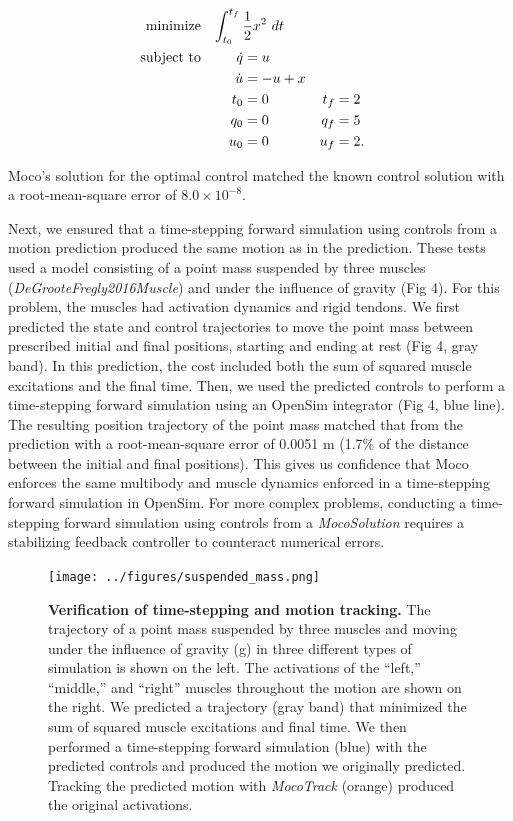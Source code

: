 \documentclass[10pt,letterpaper]{article}
\newcommand{\analytic}{
\begin{equation}
    \begin{aligned}
        \mbox{minimize} \quad
         \mathrlap{\int_{t_0}^{t_f} \frac{1}{2}x^2~dt}  \\
         \mbox{subject to} \quad
         && \dot{q} &= u \\
         && \dot{u} &= -u + x \\
         && t_0 &= 0 & t_f &= 2 \\
         && q_0 &= 0 & q_f &= 5 \\
         && u_0 &= 0 & u_f &= 2.
    \end{aligned}
\end{equation}
}
\begin{document}
\analytic

Moco’s solution for the optimal control matched the known control solution with a root-mean-square error of $8.0 \times 10^{-8}$.

Next, we ensured that a time-stepping forward simulation using controls from a motion prediction produced the same motion as in the prediction. These tests used a model consisting of a point mass suspended by three muscles (\textit{DeGrooteFregly2016Muscle}) and under the influence of gravity (Fig 4). For this problem, the muscles had activation dynamics and rigid tendons. We first predicted the state and control trajectories to move the point mass between prescribed initial and final positions, starting and ending at rest (Fig 4, gray band). In this prediction, the cost included both the sum of squared muscle excitations and the final time. Then, we used the predicted controls to perform a time-stepping forward simulation using an OpenSim integrator (Fig 4, blue line). The resulting position trajectory of the point mass matched that from the prediction with a root-mean-square error of 0.0051 m (1.7\% of the distance between the initial and final positions). This gives us confidence that Moco enforces the same multibody and muscle dynamics enforced in a time-stepping forward simulation in OpenSim. For more complex problems, conducting a time-stepping forward simulation using controls from a \textit{MocoSolution} requires a stabilizing feedback controller to counteract numerical errors.

\begin{figure}[!h]
        \centering
        \texttt{[image: ../figures/suspended\_mass.png]}
        \caption{{\bf Verification of time-stepping and motion tracking.}
       The trajectory of a point mass suspended by three muscles and moving under the influence of gravity (g) in three different types of simulation is shown on the left. The activations of the “left,” “middle,” and “right” muscles throughout the motion are shown on the right. We predicted a trajectory (gray band) that minimized the sum of squared muscle excitations and final time. We then performed a time-stepping forward simulation (blue) with the predicted controls and produced the motion we originally predicted. Tracking the predicted motion with \textit{MocoTrack} (orange) produced the original activations.
        }
        \label{verification}
\end{figure}
\end{document}
